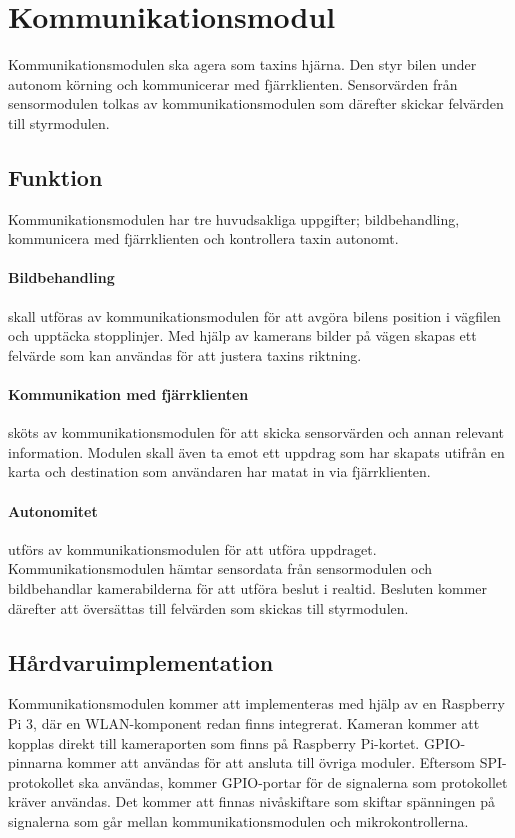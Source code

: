 \documentclass[designspec/spec.tex]{subfiles}
\begin{document}
\section{Kommunikationsmodul}
Kommunikationsmodulen ska agera som taxins hjärna. Den styr bilen under autonom
körning och kommunicerar med fjärrklienten. Sensorvärden från sensormodulen
tolkas av kommunikationsmodulen som därefter skickar felvärden till
styrmodulen.

\subsection{Funktion}
Kommunikationsmodulen har tre huvudsakliga uppgifter; bildbehandling,
kommunicera med fjärrklienten och kontrollera taxin autonomt.

\paragraph{Bildbehandling} skall utföras av kommunikationsmodulen för att
avgöra bilens position i vägfilen och upptäcka stopplinjer. Med hjälp av
kamerans bilder på vägen skapas ett felvärde som kan användas för att justera
taxins riktning.

\paragraph{Kommunikation med fjärrklienten} sköts av kommunikationsmodulen för
att skicka sensorvärden och annan relevant information. Modulen skall även ta
emot ett uppdrag som har skapats utifrån en karta och destination som
användaren har matat in via fjärrklienten.

\paragraph{Autonomitet} utförs av kommunikationsmodulen för att utföra
uppdraget. Kommunikationsmodulen hämtar sensordata från sensormodulen och
bildbehandlar kamerabilderna för att utföra beslut i realtid. Besluten kommer
därefter att översättas till felvärden som skickas till styrmodulen.

\subsection{Hårdvaruimplementation} 
Kommunikationsmodulen kommer att implementeras med hjälp av en Raspberry Pi 3,
där en WLAN-komponent redan finns integrerat. Kameran kommer att kopplas direkt
till kameraporten som finns på Raspberry Pi-kortet. GPIO-pinnarna kommer att
användas för att ansluta till övriga moduler.  Eftersom SPI-protokollet ska
användas, kommer GPIO-portar för de signalerna som protokollet kräver användas.
Det kommer att finnas nivåskiftare som skiftar spänningen på signalerna som går
mellan kommunikationsmodulen och mikrokontrollerna.
\end{document}
